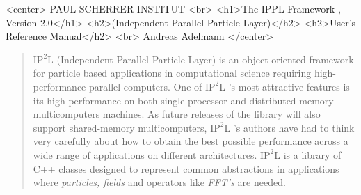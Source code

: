 \documentclass[12pt,a4paper]{report}
\newcommand{\ipplversion}{\text{2.0 }}
\newcommand{\ippl}{\textsc{I$\text{P}^2$L }}
\begin{document}
\begin{titlepage}

\begin{htmlonly}
\begin{rawhtml}
<center>
PAUL SCHERRER INSTITUT
<br>
<h1>The IPPL Framework , Version 2.0</h1>
<h2>(Independent Parallel Particle Layer)</h2>
<h2>User's Reference Manual</h2>
<br>
Andreas Adelmann  
</center>
\end{rawhtml}
\end{htmlonly}

\begin{quotation}
 \ippl (Independent Parallel Particle Layer) is an object-oriented framework for particle based applications in computational science 
requiring high-performance parallel computers. One of \ippl 's most attractive features is its high performance on both single-processor and  distributed-memory multicomputers machines. As future releases of the library will also support shared-memory multicomputers, \ippl 's authors have had to think very carefully about how to obtain the best possible performance across a wide range of applications on different architectures.
\ippl  is a library of C++ classes designed to represent common abstractions in applications where {\em particles, fields} and operators like {\em FFT's} are needed.


\end{quotation}
\end{titlepage}
\end{document}
